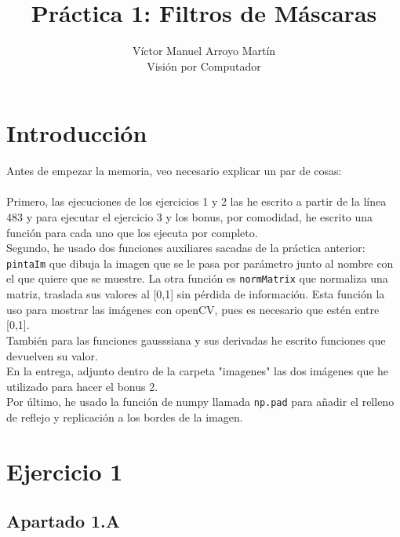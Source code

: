 \documentclass[12pt]{article}
\date{}
\begin{document}
 
\title{Práctica 1: Filtros de Máscaras}
\author{Víctor Manuel Arroyo Martín\\ %
Visión por Computador}

\maketitle
\section*{Introducción}
Antes de empezar la memoria, veo necesario explicar un par de cosas:\\\\
Primero, las ejecuciones de los ejercicios 1 y 2 las he escrito a partir de la línea 483 y para ejecutar el ejercicio 3 y los bonus, por comodidad, he escrito una función para cada uno que los ejecuta por completo.\\
Segundo, he usado dos funciones auxiliares sacadas de la práctica anterior: \texttt{pintaIm} que dibuja la imagen que se le pasa por parámetro junto al nombre con el que quiere que se muestre. La otra función es \texttt{normMatrix} que normaliza una matriz, traslada sus valores al [0,1] sin pérdida de información. Esta función la uso para mostrar las imágenes con openCV, pues es necesario que estén entre [0,1].\\
También para las funciones gausssiana y sus derivadas he escrito funciones que devuelven su valor.\\
En la entrega, adjunto dentro de la carpeta "imagenes" las dos imágenes que he utilizado para hacer el bonus 2.\\
Por último, he usado la función de numpy llamada \texttt{np.pad} para añadir el relleno de reflejo y replicación a los bordes de la imagen.

\section*{Ejercicio 1}

\subsection*{Apartado 1.A}
\end{document}
